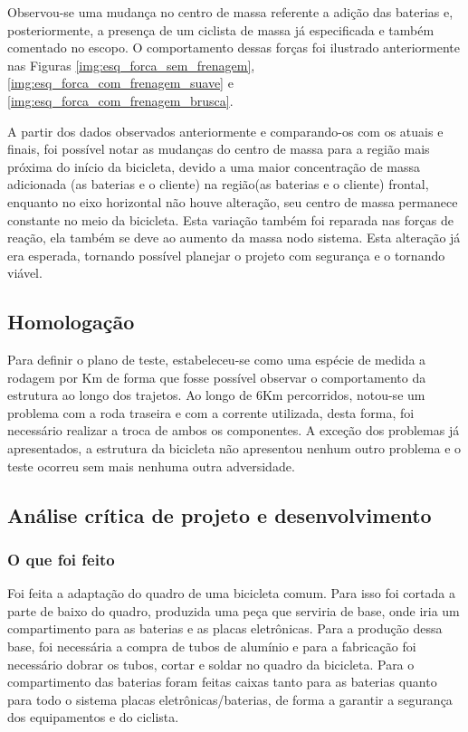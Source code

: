 	Observou-se uma mudança no centro de massa referente a adição das baterias e, posteriormente, a presença de um ciclista de massa já especificada e também comentado no escopo. O comportamento dessas forças foi ilustrado anteriormente nas 
	Figuras \ref{img:esq_forca_sem_frenagem}, \ref{img:esq_forca_com_frenagem_suave} e \ref{img:esq_forca_com_frenagem_brusca}.
	
	A partir dos dados observados anteriormente e comparando-os com os atuais e finais, foi possível notar as mudanças do centro de massa para a região mais próxima do início da bicicleta, devido a uma maior concentração de massa adicionada (as baterias e o cliente) na região(as baterias e o cliente) frontal, enquanto no eixo horizontal não houve alteração, seu centro de massa permanece constante no meio da bicicleta. Esta variação também foi reparada nas forças de reação, ela também se deve ao aumento da massa nodo sistema. Esta alteração já era esperada, tornando possível planejar o projeto com segurança e o tornando viável.

	\subsection{Homologação}
	
	Para definir o plano de teste, estabeleceu-se como uma espécie de medida a rodagem por Km de forma que fosse possível observar o comportamento da estrutura ao longo dos trajetos. Ao longo de 6Km percorridos, notou-se um problema com a roda traseira e com a corrente utilizada, desta forma, foi necessário realizar a troca de ambos os componentes.
	A exceção dos problemas já apresentados, a estrutura da bicicleta não apresentou nenhum outro problema e o teste ocorreu sem mais nenhuma outra adversidade.
	\subsection{Análise crítica de projeto e desenvolvimento}
		
		\subsubsection{O que foi feito}
		Foi feita a adaptação do quadro de uma bicicleta comum. Para isso foi cortada a parte de baixo do quadro, produzida uma peça que serviria de base, onde iria um compartimento para as baterias e as placas eletrônicas. Para a produção dessa base, foi necessária a compra de tubos de alumínio e para a fabricação foi necessário dobrar os tubos, cortar e soldar no quadro da bicicleta. Para o compartimento das baterias foram feitas caixas tanto para as baterias quanto para todo o sistema placas eletrônicas/baterias, de forma a garantir a segurança dos equipamentos e do ciclista. 
		
